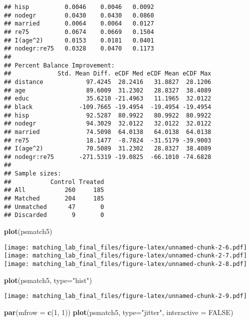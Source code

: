 \documentclass[]{article}
\newenvironment{Shaded}{\begin{snugshade}}{\end{snugshade}}
\newcommand{\DataTypeTok}[1]{\textcolor[rgb]{0.13,0.29,0.53}{#1}}
\newcommand{\DecValTok}[1]{\textcolor[rgb]{0.00,0.00,0.81}{#1}}
\newcommand{\KeywordTok}[1]{\textcolor[rgb]{0.13,0.29,0.53}{\textbf{#1}}}
\newcommand{\NormalTok}[1]{#1}
\newcommand{\OtherTok}[1]{\textcolor[rgb]{0.56,0.35,0.01}{#1}}
\newcommand{\StringTok}[1]{\textcolor[rgb]{0.31,0.60,0.02}{#1}}
\begin{document}
\begin{verbatim}
## hisp          0.0046    0.0046   0.0092
## nodegr        0.0430    0.0430   0.0860
## married       0.0064    0.0064   0.0127
## re75          0.0674    0.0669   0.1504
## I(age^2)      0.0153    0.0181   0.0401
## nodegr:re75   0.0328    0.0470   0.1173
## 
## Percent Balance Improvement:
##             Std. Mean Diff. eCDF Med eCDF Mean eCDF Max
## distance            97.4245  28.2416   31.8827  28.1206
## age                 89.6009  31.2302   28.8327  38.4089
## educ                35.6210 -21.4963   11.1965  32.0122
## black             -109.7665 -19.4954  -19.4954 -19.4954
## hisp                92.5287  80.9922   80.9922  80.9922
## nodegr              94.3029  32.0122   32.0122  32.0122
## married             74.5098  64.0138   64.0138  64.0138
## re75                18.1477  -8.7824  -31.5179 -39.9003
## I(age^2)            70.5089  31.2302   28.8327  38.4089
## nodegr:re75       -271.5319 -19.0825  -66.1010 -74.6828
## 
## Sample sizes:
##           Control Treated
## All           260     185
## Matched       204     185
## Unmatched      47       0
## Discarded       9       0
\end{verbatim}

\begin{Shaded}
\begin{Highlighting}[]
\KeywordTok{plot}\NormalTok{(psmatch5)}
\end{Highlighting}
\end{Shaded}

\texttt{[image: matching\_lab\_final\_files/figure-latex/unnamed-chunk-2-6.pdf]}
\texttt{[image: matching\_lab\_final\_files/figure-latex/unnamed-chunk-2-7.pdf]}
\texttt{[image: matching\_lab\_final\_files/figure-latex/unnamed-chunk-2-8.pdf]}

\begin{Shaded}
\begin{Highlighting}[]
\KeywordTok{plot}\NormalTok{(psmatch5, }\DataTypeTok{type=}\StringTok{"hist"}\NormalTok{)}
\end{Highlighting}
\end{Shaded}

\texttt{[image: matching\_lab\_final\_files/figure-latex/unnamed-chunk-2-9.pdf]}

\begin{Shaded}
\begin{Highlighting}[]
\KeywordTok{par}\NormalTok{(}\DataTypeTok{mfrow =} \KeywordTok{c}\NormalTok{(}\DecValTok{1}\NormalTok{, }\DecValTok{1}\NormalTok{))}
\KeywordTok{plot}\NormalTok{(psmatch5, }\DataTypeTok{type=}\StringTok{"jitter"}\NormalTok{, }\DataTypeTok{interactive =} \OtherTok{FALSE}\NormalTok{)}
\end{Highlighting}
\end{Shaded}
\end{document}
